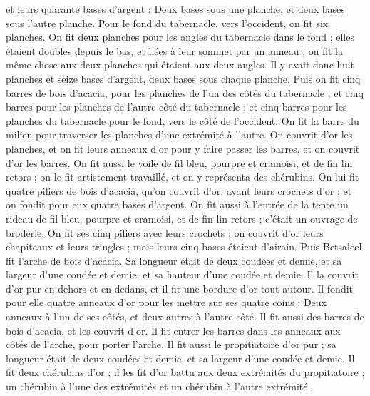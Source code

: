 \begin{multicols}{2}
et leurs quarante bases d'argent : Deux bases sous une planche, et deux bases sous l'autre planche.
Pour le fond du tabernacle, vers l'occident, on fit six planches.
On fit deux planches pour les angles du tabernacle dans le fond ;
elles étaient doubles depuis le bas, et liées à leur sommet par un anneau ; on fit la même chose aux deux planches qui étaient aux deux angles.
Il y avait donc huit planches et seize bases d'argent, deux bases sous chaque planche.
Puis on fit cinq barres de bois d’acacia, pour les planches de l'un des côtés du tabernacle ;
et cinq barres pour les planches de l'autre côté du tabernacle ; et cinq barres pour les planches du tabernacle pour le fond, vers le côté de l'occident.
On fit la barre du milieu pour traverser les planches d’une extrémité à l’autre.
On couvrit d'or les planches, et on fit leurs anneaux d'or pour y faire passer les barres, et on couvrit d'or les barres.
On fit aussi le voile de fil bleu, pourpre et cramoisi, et de fin lin retors ; on le fit artistement travaillé, et on y représenta des chérubins.
On lui fit quatre piliers de bois d’acacia, qu'on couvrit d'or, ayant leurs crochets d'or ; et on fondit pour eux quatre bases d'argent.
On fit aussi à l'entrée de la tente un rideau de fil bleu, pourpre et cramoisi, et de fin lin retors ; c’était un ouvrage de broderie.
On fit ses cinq piliers avec leurs crochets ; on couvrit d'or leurs chapiteaux et leurs tringles ; mais leurs cinq bases étaient d'airain.
\VerseOne{}Puis Betsaleel fit l'arche de bois d’acacia. Sa longueur était de deux coudées et demie, et sa largeur d'une coudée et demie, et sa hauteur d'une coudée et demie.
Il la couvrit d’or pur en dehors et en dedans, et il fit une bordure d'or tout autour.
Il fondit pour elle quatre anneaux d'or pour les mettre sur ses quatre coins : Deux anneaux à l'un de ses côtés, et deux autres à l'autre côté.
Il fit aussi des barres de bois d’acacia, et les couvrit d'or.
Il fit entrer les barres dans les anneaux aux côtés de l'arche, pour porter l'arche.
Il fit aussi le propitiatoire d’or pur ; sa longueur était de deux coudées et demie, et sa largeur d'une coudée et demie.
Il fit deux chérubins d'or ; il les fit d’or battu aux deux extrémités du propitiatoire ;
un chérubin à l’une des extrémités et un chérubin à l’autre extrémité.

\end{multicols}
